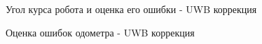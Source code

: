 \documentclass[14pt]{article}
\begin{document}
\begin{figure}
\noindent{}
\caption{Угол курса робота и  оценка его ошибки - UWB коррекция}
\label{fig:uwb_heading}
\end{figure}

\begin{figure}
\noindent{}
\caption{Оценка ошибок одометра - UWB коррекция}
\label{fig:uwb_odometer}
\end{figure}
\end{document}

